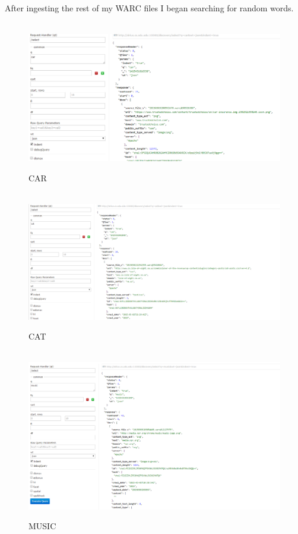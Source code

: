 \documentclass[12pt]{article}
\begin{document}
After ingesting the rest of my WARC files I began searching for random words.

\begin{figure}[H]
    \caption{CAR}
    \centering
    \includegraphics[scale=0.5]{car.PNG}
\end{figure}

\begin{figure}[H]
    \caption{CAT}
    \centering
    \includegraphics[scale=0.5]{catquery.PNG}
\end{figure}

\begin{figure}[H]
    \caption{MUSIC}
    \centering
    \includegraphics[scale=0.5]{music.PNG}
\end{figure}
\end{document}
